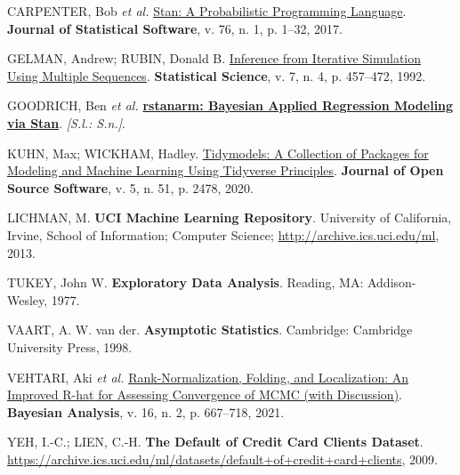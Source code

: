 \documentclass[
  brazilian,
  12pt,
  letterpaper,
  DIV=11,
  numbers=noendperiod]{scrartcl}
\newlength{\cslhangindent}
\newenvironment{CSLReferences}[2] %
 {\begin{list}{}{%
  \setlength{\itemindent}{0pt}
  \setlength{\leftmargin}{0pt}
  \setlength{\parsep}{0pt}
  \ifodd #1
   \setlength{\leftmargin}{\cslhangindent}
   \setlength{\itemindent}{-1\cslhangindent}
  \fi
  \setlength{\itemsep}{#2\baselineskip}}}
 {\end{list}}
\begin{document}
\protect{}\label{refs}
\begin{CSLReferences}{0}{1}
CARPENTER, Bob \emph{et al.}
\href{https://doi.org/10.18637/jss.v076.i01}{Stan: A Probabilistic
Programming Language}. \textbf{Journal of Statistical Software}, v. 76,
n. 1, p. 1--32, 2017.

GELMAN, Andrew; RUBIN, Donald B.
\href{https://doi.org/10.1214/ss/1177011136}{Inference from Iterative
Simulation Using Multiple Sequences}. \textbf{Statistical Science}, v.
7, n. 4, p. 457--472, 1992.

GOODRICH, Ben \emph{et al.}
\textbf{\href{https://mc-stan.org/rstanarm/}{rstanarm: Bayesian Applied
Regression Modeling via Stan}}. \emph{{[}S.l.: S.n.{]}}.

KUHN, Max; WICKHAM, Hadley.
\href{https://doi.org/10.21105/joss.02478}{Tidymodels: A Collection of
Packages for Modeling and Machine Learning Using Tidyverse Principles}.
\textbf{Journal of Open Source Software}, v. 5, n. 51, p. 2478, 2020.

LICHMAN, M. \textbf{UCI Machine Learning Repository}. University of
California, Irvine, School of Information; Computer Science;
\url{http://archive.ics.uci.edu/ml}, 2013.

TUKEY, John W. \textbf{Exploratory Data Analysis}. Reading, MA:
Addison-Wesley, 1977.

VAART, A. W. van der. \textbf{Asymptotic Statistics}. Cambridge:
Cambridge University Press, 1998.

VEHTARI, Aki \emph{et al.}
\href{https://doi.org/10.1214/20-BA1221}{Rank-Normalization, Folding,
and Localization: An Improved {R-hat} for Assessing Convergence of
{MCMC} (with Discussion)}. \textbf{Bayesian Analysis}, v. 16, n. 2, p.
667--718, 2021.

YEH, I.-C.; LIEN, C.-H. \textbf{The Default of Credit Card Clients
Dataset}.
\url{https://archive.ics.uci.edu/ml/datasets/default+of+credit+card+clients},
2009.

\end{CSLReferences}
\end{document}
